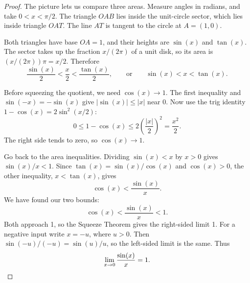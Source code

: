 \begin{proof}
The picture lets us compare three areas. Measure angles in radians,
and take $0<x<\pi/2$. The triangle $OAB$ lies inside the unit-circle
sector, which lies inside triangle $OAT$. The line $AT$ is tangent to
the circle at $A=(1,0)$.
\begin{center}
\end{center}

Both triangles have base $OA=1$, and their heights are $\sin(x)$ and
$\tan(x)$. The sector takes up the fraction $x/(2\pi)$ of a unit disk,
so its area is $(x/(2\pi))\pi=x/2$. Therefore
$$\frac{\sin(x)}2<\frac{x}2<\frac{\tan(x)}2,
\qquad\text{or}\qquad \sin(x)<x<\tan(x).$$

Before squeezing the quotient, we need $\cos(x)\to1$.
The first inequality and $\sin(-x)=-\sin(x)$ give
$|\sin(x)|\leq |x|$ near 0. Now use the trig identity
$1-\cos(x)=2\sin^2(x/2)$:
$$0\leq1-\cos(x)\leq2\left(\frac{|x|}{2}\right)^2
=\frac{x^2}{2}.$$
The right side tends to zero, so $\cos(x)\to1$.

Go back to the area inequalities. Dividing $\sin(x)<x$ by $x>0$
gives $\sin(x)/x<1$. Since $\tan(x)=\sin(x)/\cos(x)$ and $\cos(x)>0$,
the other inequality, $x<\tan(x)$, gives
$$\cos(x)<\frac{\sin(x)}x.$$
We have found our two bounds:
$$\cos(x)<\frac{\sin(x)}x<1.$$
Both approach 1, so the Squeeze Theorem gives the right-sided limit 1.
For a negative input write $x=-u$, where $u>0$. Then
$\sin(-u)/(-u)=\sin(u)/u$, so the left-sided limit is the same. Thus
\[
\lim_{x\to0}\frac{\sin(x)}x=1.
\qedhere
\]
\end{proof}

